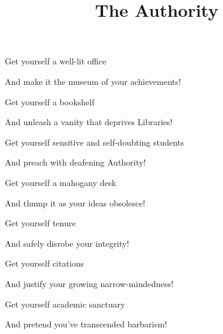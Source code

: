 \documentclass{article}
\title{The Authority}
\begin{document}
 \newline

Get yourself a well-lit office \newline

And make it the museum of your achievements!\newline\newline

Get yourself a bookshelf\newline

And unleash a vanity that deprives Libraries!\newline\newline

Get yourself sensitive and self-doubting students\newline

And preach with deafening Authority!\newline\newline

Get yourself a mahogany desk\newline

And thump it as your ideas obsolesce!\newline\newline

Get yourself tenure\newline

And safely disrobe your integrity!\newline\newline

Get yourself citations\newline

And justify your growing narrow-mindedness!\newline\newline

Get yourself academic sanctuary\newline

And pretend you've transcended barbarism!\newline\newline
\end{document}
